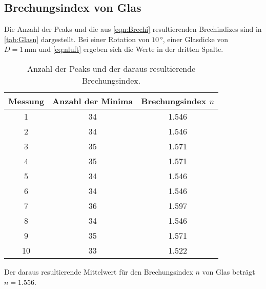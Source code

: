\subsection{Brechungsindex von Glas}
\label{sec:AuswGlas}
Die Anzahl der Peaks und die aus \autoref{eqn:Brechi} resultierenden Brechindizes sind in \autoref{tab:Glasn} dargestellt. Bei einer Rotation von $10\, °$, einer Glasdicke von $D=1\, \unit{\milli \meter}$ und \autoref{eq:nluft} ergeben sich die Werte in der dritten Spalte.
\begin{table}
    \centering
    \caption{Anzahl der Peaks und der daraus resultierende Brechungsindex.}
    \begin{tabular}{c c c}
        \toprule
        Messung & Anzahl der Minima & Brechungsindex $n$ \\
        \midrule
             1 & 34 & 1.546\\
             2 & 34 & 1.546\\
             3 & 35 & 1.571\\
             4 & 35 & 1.571\\
             5 & 34 & 1.546\\
             6 & 34 & 1.546\\
             7 & 36 & 1.597\\
             8 & 34 & 1.546\\
             9 & 35 & 1.571\\
            10 & 33 & 1.522\\
            \bottomrule
    \end{tabular}
    \label{tab:Glasn}
\end{table}
Der daraus resultierende Mittelwert für den Brechungsindex $n$ von Glas beträgt $n=1.556$.


